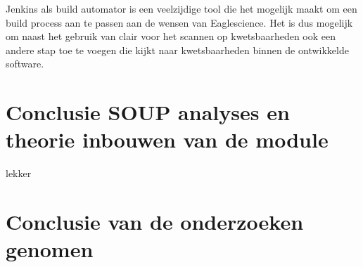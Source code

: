 Jenkins als build automator is een veelzijdige tool die het mogelijk maakt om een build process aan te passen aan de wensen van Eaglescience. Het is dus mogelijk om naast het gebruik van clair voor het scannen op kwetsbaarheden ook een andere stap toe te voegen die kijkt naar kwetsbaarheden binnen de ontwikkelde software.

\section{Conclusie SOUP analyses en theorie inbouwen van de module}
lekker
\lipsum[01]

\section{Conclusie van de onderzoeken genomen} %
